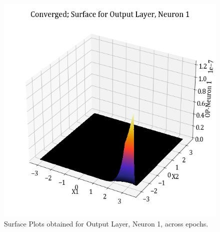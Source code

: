 \documentclass[11pt,a4paper]{article}
\begin{document}
\begin{figure}[H]
    \includegraphics[scale=0.4]{images/1B_MLFFNN_conv_OP_N1.png}
    \caption{Surface Plots obtained for Output Layer, Neuron 1, across epochs.}
\end{figure}
\end{document}
